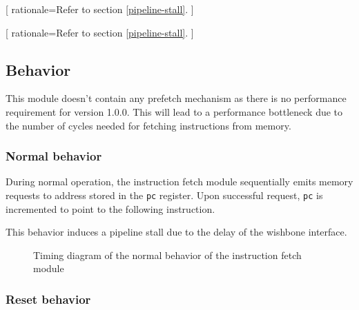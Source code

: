 [
  rationale=Refer to section \ref{pipeline-stall}.
]

[
  rationale=Refer to section \ref{pipeline-stall}.
]


\subsection{Behavior}

\begin{content}
  This module doesn't contain any prefetch mechanism as there is no performance requirement for version 1.0.0. This will lead to a performance bottleneck due to the number of cycles needed for fetching instructions from memory.
\end{content}

\subsubsection{Normal behavior}

\begin{content}
  During normal operation, the instruction fetch module sequentially emits memory requests to address stored in the \texttt{pc} register. Upon successful request, \texttt{pc} is incremented to point to the following instruction.

  This behavior induces a pipeline stall due to the delay of the wishbone interface.
\end{content}

\begin{figure}[H]
    \centering
    
    \caption{Timing diagram of the normal behavior of the instruction fetch module}
    \label{fig:ifm-behavior-normal}
\end{figure}

\subsubsection{Reset behavior}

